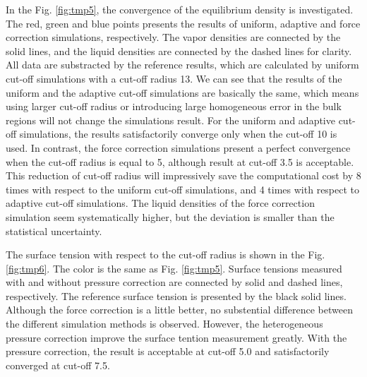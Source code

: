 \documentclass[aps,pre,preprint]{revtex4}
\begin{document}
In the Fig. \ref{fig:tmp5}, the convergence of the equilibrium density
is investigated. The red, green and blue points presents the results
of uniform, adaptive and force correction simulations, respectively.
The vapor densities are connected by the solid lines, and the liquid
densities are connected by the dashed lines for clarity. All data are
substracted by the reference results, which are calculated by uniform
cut-off simulations with a cut-off radius 13. We can see that the
results of the uniform and the adaptive cut-off simulations are
basically the same, which means using larger cut-off radius or
introducing large homogeneous error in the bulk regions will not
change the simulations result. For the uniform and adaptive cut-off
simulations, the results satisfactorily converge only when the cut-off
10 is used. In contrast, the force correction simulations present a
perfect convergence when the cut-off radius is equal to 5, although
result at cut-off 3.5 is acceptable. This reduction of cut-off radius
will impressively save the computational cost by 8 times with respect
to the uniform cut-off simulations, and 4 times with respect to
adaptive cut-off simulations. The liquid densities of the force
correction simulation seem systematically higher, but the deviation is
smaller than the statistical uncertainty. 

The surface tension with respect to the cut-off radius is shown in the
Fig. \ref{fig:tmp6}. The color is the same as Fig. \ref{fig:tmp5}.
Surface tensions measured with and without pressure correction are
connected by solid and dashed lines, respectively.  The reference
surface tension is presented by the black solid lines. Although the
force correction is a little better, no substential difference between
the different simulation methods is observed. However, the
heterogeneous pressure correction improve the surface tention
measurement greatly. With the pressure correction, the result is
acceptable at cut-off 5.0 and satisfactorily converged at cut-off 7.5.



\end{document}
